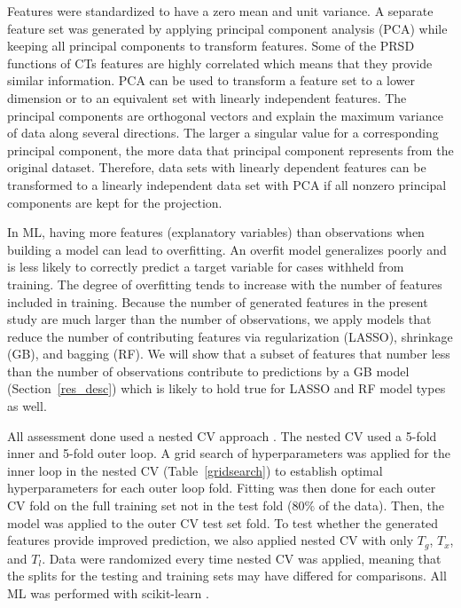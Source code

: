 \documentclass[11pt,a4paper]{article}
\begin{document}
\par
Features were standardized to have a zero mean and unit variance. A separate feature set was generated by applying principal component analysis (PCA) while keeping all principal components to transform features. Some of the PRSD functions of CTs features are highly correlated which means that they provide similar information. PCA can be used to transform a feature set to a lower dimension or to an equivalent set with linearly independent features. The principal  components are orthogonal vectors and explain the maximum variance of data along several directions. The larger a singular value for a corresponding principal  component, the more data that principal  component represents from the original dataset. Therefore, data sets with linearly dependent features can be transformed to a linearly independent data set with PCA if all nonzero principal components are kept for the projection.

\par
In ML, having more features (explanatory variables) than observations when building a model can lead to overfitting. An overfit model generalizes poorly and is less likely to correctly predict a target variable for cases withheld from training. The degree of overfitting tends to increase with the number of features included in training. Because the number of generated features in the present study are much larger than the number of observations, we apply models that reduce the number of contributing features via regularization (LASSO), shrinkage (GB), and bagging (RF). We will show that a subset of features that number less than the number of observations contribute to predictions by a GB model (Section~\ref{res_desc}) which is likely to hold true for LASSO and RF model types as well.

\par
All assessment done used a nested CV approach \cite{Cawley2010}. The nested CV used a 5-fold inner and 5-fold outer loop. A grid search of hyperparameters was applied for the inner loop in the nested CV (Table~\ref{gridsearch}) to establish optimal hyperparameters for each outer loop fold. Fitting was then done for each outer CV fold on the full training set not in the test fold ($80\%$ of the data). Then, the model was applied to the outer CV test set fold. To test whether the generated features provide improved prediction, we also applied nested CV with only $T_{g}$, $T_{x}$, and $T_{l}$. Data were randomized every time nested CV was applied, meaning that the splits for the testing and training sets may have differed for comparisons. All ML was performed with scikit-learn \cite{scikit-learn}.
\end{document}

